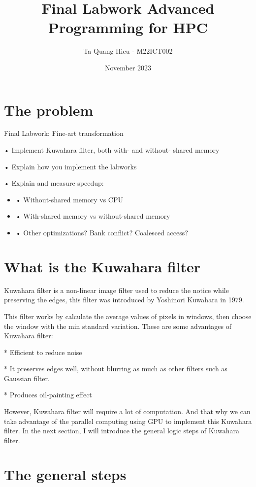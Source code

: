 \documentclass{article}
\title{Final Labwork Advanced Programming for HPC}
\author{Ta Quang Hieu - M22ICT002}
\date{November 2023}
\begin{document}
	
	\maketitle
	
	\section{The problem}
	Final Labwork: Fine-art transformation
	
	• Implement Kuwahara filter, both with- and without- shared memory
	
	• Explain how you implement the labworks
	
	• Explain and measure speedup:
	\begin{itemize}
		\item • Without-shared memory vs CPU
		\item • With-shared memory vs without-shared memory
		\item • Other optimizations? Bank conflict? Coalesced access?
	\end{itemize}    
	
	
	\section{What is the Kuwahara filter}
	Kuwahara filter is a non-linear image filter used to reduce the notice while preserving the edges, this filter was introduced by Yoshinori Kuwahara in 1979.
	
	This filter works by calculate the average values of pixels in windows, then choose the window with the min standard variation. These are some advantages of Kuwahara filter:
	
	* Efficient to reduce noise
	
	* It preserves edges well, without blurring as much as other filters such as Gaussian filter.
	
	* Produces oil-painting effect
	
	However, Kuwahara filter will require a lot of computation. And that why we can take advantage of the parallel computing using GPU to implement this Kuwahara filter. In the next section, I will introduce the general logic steps of Kuwahara filter.
	
	\section{The general steps}
	
\end{document}
